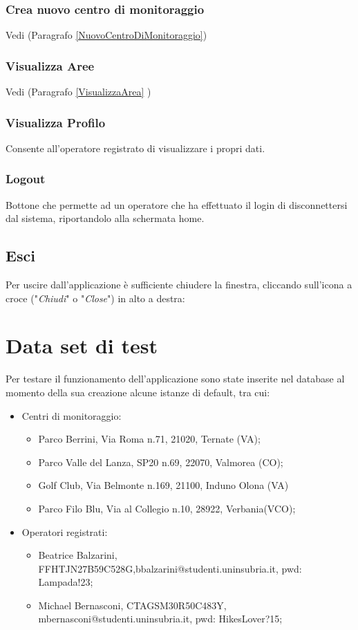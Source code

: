 \subsection{Crea nuovo centro di monitoraggio}
Vedi (Paragrafo \ref{NuovoCentroDiMonitoraggio})
\subsection{Visualizza Aree}
Vedi (Paragrafo \ref{VisualizzaArea} )

\subsection{Visualizza Profilo} \label{Profilo}
Consente all'operatore registrato di visualizzare i propri dati.

\subsection{Logout}
Bottone che permette ad un operatore che ha effettuato il login di disconnettersi dal sistema, riportandolo alla schermata home. 

\section{Esci}
Per uscire dall'applicazione è sufficiente chiudere la finestra, cliccando sull'icona a croce ("\textit{Chiudi}" o "\textit{Close}") in alto a destra:

\chapter{Data set di test}
Per testare il funzionamento dell'applicazione sono state inserite nel database al momento della sua creazione alcune istanze di default, tra cui:
\begin{itemize}
	\item Centri di monitoraggio:
	\begin{itemize}
		\item Parco Berrini, Via Roma n.71, 21020, Ternate (VA);
		\item Parco Valle del Lanza, SP20 n.69, 22070, Valmorea (CO);
		\item Golf Club, Via Belmonte n.169, 21100, Induno Olona (VA)
		\item Parco Filo Blu, Via al Collegio n.10,
		28922, Verbania(VCO);
	\end{itemize}
	\item Operatori registrati:
	\begin{itemize}
		\item Beatrice Balzarini, FFHTJN27B59C528G,bbalzarini@studenti.uninsubria.it, pwd: Lampada!23;
		\item Michael Bernasconi, CTAGSM30R50C483Y, mbernasconi@studenti.uninsubria.it, pwd: HikesLover?15;
	\end{itemize}
\end{itemize}




